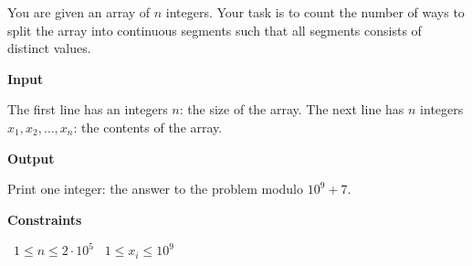 You are given an array of $n$ integers. Your task is to count the number of ways to split the array into continuous segments such that all segments consists of distinct values.

\vspace{0.3cm}\noindent\textbf{Input}

The first line has an integers $n$: the size of the array.
The next line has $n$ integers $x_1, x_2,\dots, x_n$: the contents of the array.

\vspace{0.3cm}\noindent\textbf{Output}

Print one integer: the answer to the problem modulo $10^9 + 7$.

\vspace{0.3cm}\noindent\textbf{Constraints}

\textbullet\ $1 \le n \le 2 \cdot 10^5$
\textbullet\ $1 \le x_i \le 10^9$
